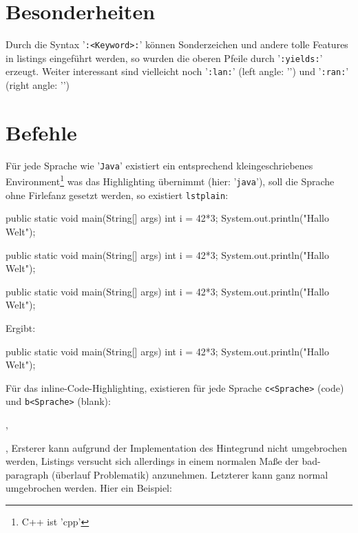 \documentclass{article}
\begin{document}
\section{Besonderheiten}
Durch die Syntax '\verb|:<Keyword>:|' können Sonderzeichen und andere tolle Features in listings eingeführt werden, so wurden die oberen Pfeile durch '\verb|:yields:|' erzeugt. Weiter interessant sind vielleicht noch '\verb|:lan:|' (left angle: '') und '\verb|:ran:|' (right angle: '')

\section{Befehle}
Für jede Sprache wie '\verb|Java|' existiert ein entsprechend kleingeschriebenes Environment\footnote{C++ ist 'cpp'} was das Highlighting übernimmt (hier: '\verb|java|'), soll die Sprache ohne Firlefanz gesetzt werden, so existiert \verb|lstplain|:
\begin{latex}
\begin{lstplain}[language=lJava]
public static void main(String[] args) {
    int i = 42*3;
    System.out.println("Hallo Welt");
}
\end{lstplain}
\end{latex}
\begin{plainlatex}
\begin{lstplain}[language=lJava]
public static void main(String[] args) {
    int i = 42*3;
    System.out.println("Hallo Welt");
}
\end{lstplain}
\end{plainlatex}
\begin{slatex}
\begin{lstplain}[language=lJava]
public static void main(String[] args) {
    int i = 42*3;
    System.out.println("Hallo Welt");
}
\end{lstplain}
\end{slatex}
Ergibt:
\begin{lstplain}[language=lJava]
public static void main(String[] args) {
    int i = 42*3;
    System.out.println("Hallo Welt");
}
\end{lstplain}
Für das inline-Code-Highlighting, existieren für jede Sprache \verb|c<Sprache>| (code) und \verb|b<Sprache>| (blank):
\begin{latex}
, 
\end{latex}
, \newline
Ersterer kann aufgrund der Implementation des Hintegrund nicht umgebrochen werden, Listings versucht sich allerdings in einem normalen Maße der bad-paragraph (überlauf Problematik) anzunehmen. Letzterer kann ganz normal umgebrochen werden. Hier ein Beispiel:\newline
\end{document}
